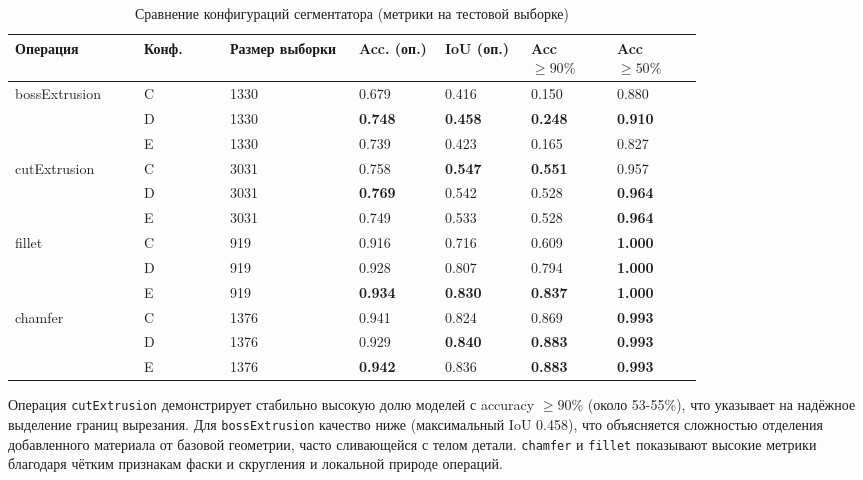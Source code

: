 \begin{table}[h]
\centering
\small
\begin{tabular}{|p{0.15\linewidth}|p{0.1\linewidth}|p{0.15\linewidth}|p{0.1\linewidth}|p{0.1\linewidth}|p{0.1\linewidth}|p{0.1\linewidth}|}
\hline
\textbf{Операция} & \textbf{Конф.} & \textbf{Размер выборки} & \textbf{Acc. (оп.)} & \textbf{IoU (оп.)} & \textbf{Acc $\ge 90\%$} & \textbf{Acc $\ge 50\%$} \\
\hline
\multirow{3}{*}{bossExtrusion} & C & 1330 & 0.679          & 0.416          & 0.150          & 0.880 \\
                               & D & 1330 & \textbf{0.748} & \textbf{0.458} & \textbf{0.248} & \textbf{0.910} \\
                               & E & 1330 & 0.739          & 0.423          & 0.165          & 0.827 \\
\hline
\multirow{3}{*}{cutExtrusion}  & C & 3031 & 0.758          & \textbf{0.547} & \textbf{0.551} & 0.957 \\
                               & D & 3031 & \textbf{0.769} & 0.542          & 0.528          & \textbf{0.964} \\
                               & E & 3031 & 0.749          & 0.533          & 0.528          & \textbf{0.964} \\
\hline
\multirow{3}{*}{fillet}        & C & 919  & 0.916          & 0.716          & 0.609          & \textbf{1.000} \\
                               & D & 919  & 0.928          & 0.807          & 0.794          & \textbf{1.000} \\
                               & E & 919  & \textbf{0.934} & \textbf{0.830} & \textbf{0.837} & \textbf{1.000} \\
\hline
\multirow{3}{*}{chamfer}       & C & 1376 & 0.941          & 0.824          & 0.869          & \textbf{0.993} \\
                               & D & 1376 & 0.929          & \textbf{0.840} & \textbf{0.883} & \textbf{0.993} \\
                               & E & 1376 & \textbf{0.942} & 0.836          & \textbf{0.883} & \textbf{0.993} \\
\hline
\end{tabular}
\caption{Сравнение конфигураций сегментатора (метрики на тестовой выборке)}
\label{tab:seg-comparison}
\end{table}

Операция \texttt{cutExtrusion} демонстрирует стабильно высокую долю моделей с accuracy $\ge 90\%$ (около 53-55\%), что указывает на надёжное выделение границ вырезания. Для \texttt{bossExtrusion} качество ниже (максимальный IoU 0.458), что объясняется сложностью отделения добавленного материала от базовой геометрии, часто сливающейся с телом детали. \texttt{chamfer} и \texttt{fillet} показывают высокие метрики благодаря чётким признакам фаски и скругления и локальной природе операций.





